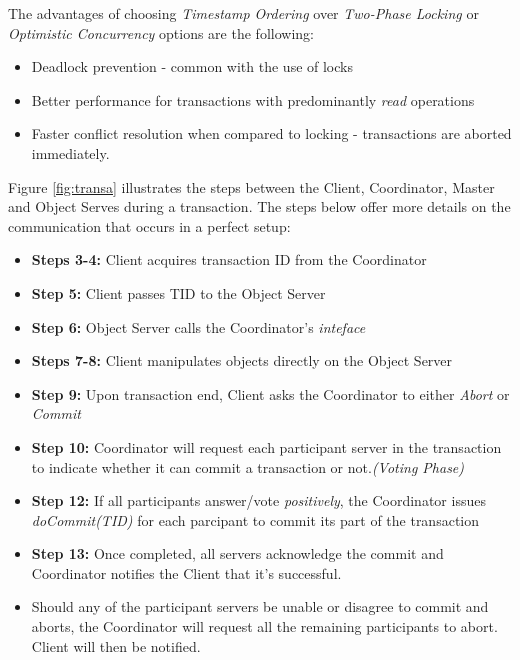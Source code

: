 \documentclass[times, 10pt,twocolumn]{article}
\begin{document}
The advantages of choosing {\it Timestamp Ordering} over {\it Two-Phase Locking} or {\it Optimistic Concurrency} options are the following: 
\begin{itemize}[noitemsep, nolistsep]
\item Deadlock prevention - common with the use of locks
\item Better performance for transactions with predominantly {\it read} operations \cite{bernstein1987concurrency}
\item Faster conflict resolution when compared to locking - transactions are aborted immediately.
\end{itemize}

Figure \ref{fig:transa} illustrates the steps between the Client, Coordinator, Master and Object Serves during a transaction. The steps below offer more details on the communication that occurs in a perfect setup: 

\begin{itemize}[noitemsep, nolistsep]
\item {\bf Steps 3-4:} Client acquires transaction ID from the Coordinator 
\item {\bf Step 5:} Client passes TID to the Object Server
\item {\bf Step 6:} Object Server calls the Coordinator's {\it inteface}
\item {\bf Steps 7-8:} Client manipulates objects directly on the Object Server
\item {\bf Step 9:} Upon transaction end, Client asks the Coordinator to either {\it Abort} or {\it Commit} 
\item {\bf Step 10:} Coordinator will request each participant server in the transaction to indicate whether it can commit a transaction or not.{\it (Voting Phase)}
\item {\bf Step 12:} If all participants answer/vote {\it positively}, the Coordinator issues {\it doCommit(TID)} for each parcipant to commit its part of the transaction
\item {\bf Step 13:} Once completed, all servers acknowledge the commit and Coordinator notifies the Client that it's successful.
\item Should any of the participant servers be unable or disagree to commit and aborts, the Coordinator will request all the remaining participants to abort. Client will then be notified.
\end{itemize}
\end{document}
